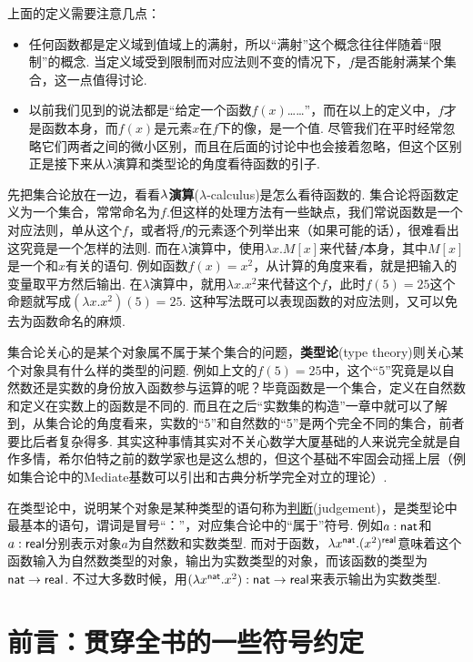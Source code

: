 上面的定义需要注意几点：
\begin{itemize}
    \item [\(\bullet\)] 任何函数都是定义域到值域上的满射，所以“满射”这个概念往往伴随着“限制”的概念. 当定义域受到限制而对应法则不变的情况下，\(f\)是否能射满某个集合，这一点值得讨论.
    \item [\(\bullet\)] 以前我们见到的说法都是“给定一个函数\(f(x)\)……”，而在以上的定义中，\(f\)才是函数本身，而\(f(x)\)是元素\(x\)在\(f\)下的像，是一个值. 尽管我们在平时经常忽略它们两者之间的微小区别，而且在后面的讨论中也会接着忽略，但这个区别正是接下来从\(\lambda\)演算和类型论的角度看待函数的引子.
\end{itemize}

先把集合论放在一边，看看\({\rm \lambda}\)\textbf{演算}(\(\lambda\)-calculus)是怎么看待函数的. 集合论将函数定义为一个集合，常常命名为\(f\).但这样的处理方法有一些缺点，我们常说函数是一个对应法则，单从这个\(f\)，或者将\(f\)的元素逐个列举出来（如果可能的话），很难看出这究竟是一个怎样的法则. 而在\(\lambda\)演算中，使用\(\lambda x.M[x]\)来代替\(f\)本身，其中\(M[x]\)是一个和\(x\)有关的语句. 例如函数\(f(x)=x^2\)，从计算的角度来看，就是把输入的变量取平方然后输出. 在\(\lambda\)演算中，就用\(\lambda x.x^2\)来代替这个\(f\)，此时\(f(5)=25\)这个命题就写成\((\lambda x.x^2)(5)=25\). 这种写法既可以表现函数的对应法则，又可以免去为函数命名的麻烦.

集合论关心的是某个对象属不属于某个集合的问题，\textbf{类型论}(type theory)则关心某个对象具有什么样的类型的问题. 例如上文的\(f(5)=25\)中，这个“\(5\)”究竟是以自然数还是实数的身份放入函数参与运算的呢？毕竟函数是一个集合，定义在自然数和定义在实数上的函数是不同的. 而且在之后“实数集的构造”一章中就可以了解到，从集合论的角度看来，实数的“5”和自然数的“5”是两个完全不同的集合，前者要比后者复杂得多. 其实这种事情其实对不关心数学大厦基础的人来说完全就是自作多情，希尔伯特之前的数学家也是这么想的，但这个基础不牢固会动摇上层（例如集合论中的Mediate基数可以引出和古典分析学完全对立的理论）.

在类型论中，说明某个对象是某种类型的语句称为\uline{判断}(judgement)，是类型论中最基本的语句，谓词是冒号“：”，对应集合论中的“属于”符号. 例如\(a:{\sf nat}\)和\(a:{\sf real}\)分别表示对象\(a\)为自然数和实数类型. 而对于函数，\(\lambda x^{\sf nat}. (x^2)^{\sf real}\)意味着这个函数输入为自然数类型的对象，输出为实数类型的对象，而该函数的类型为\({\sf nat}\to{\sf real}\). 不过大多数时候，用\((\lambda x^{\sf nat}. x^2):{\sf nat} \to {\sf real}\)来表示输出为实数类型.

\section*{前言：贯穿全书的一些符号约定}

